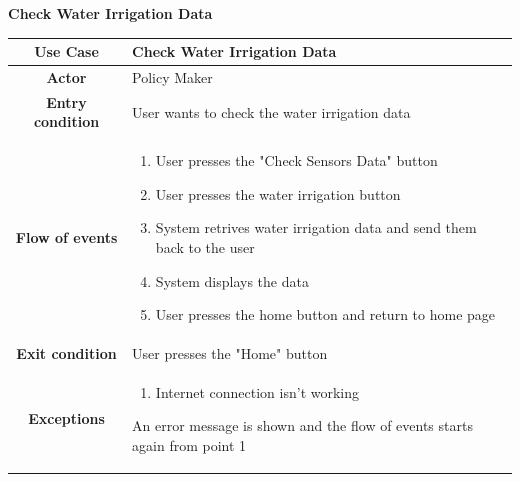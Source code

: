 \documentclass[table, 12pt]{article}
\begin{document}
\begin{itemize}
            \begin{table}[H]
                \item[] \textbf{Check Water Irrigation Data}
                \item[] 
                \centering
                \begin{tabular}{|c| m{}|}
                    \hline
                    \textbf{Use Case} & Check Water Irrigation Data\\ \hline
                    \textbf{Actor} & Policy Maker \\ \hline
                    \textbf{Entry condition} & User wants to check the water irrigation data\\  \hline
                    \textbf{Flow of events} & \begin{enumerate}
                                                \item User presses the "Check Sensors Data" button
                                                \item User presses the water irrigation button
                                                \item System retrives water irrigation data and send them back to the user 
                                                \item System displays the data
                                                \item User presses the home button and return to home page
                                            \end{enumerate}\\ \hline
                    \textbf{Exit condition} & User presses the "Home" button\\ \hline
                    \textbf{Exceptions} & \begin{enumerate}
                        \item Internet connection isn't working
                    \end{enumerate}
                    An error message is shown and the flow of events starts again from point 1\\ \hline                   
                \end{tabular}
            \end{table}


\end{itemize}
\end{document}
